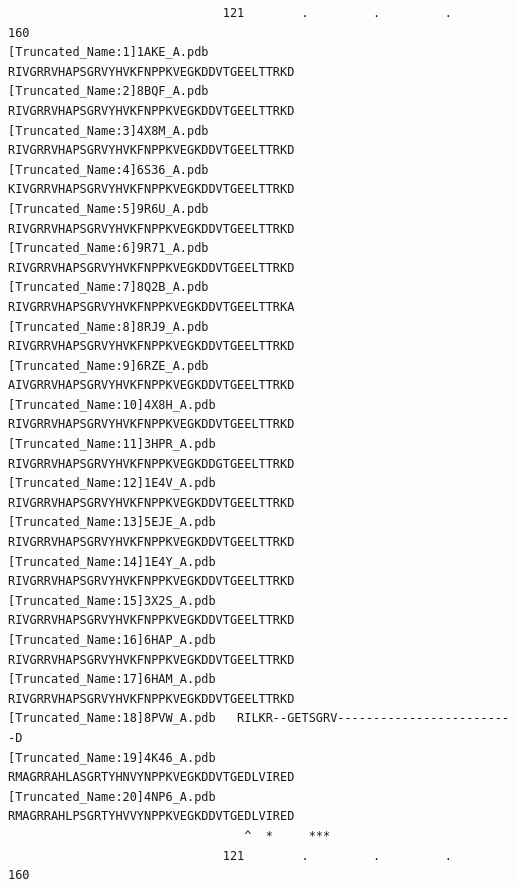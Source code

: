 \documentclass[
  letterpaper,
  DIV=11,
  numbers=noendperiod]{scrartcl}
\begin{document}
\begin{verbatim}
                              121        .         .         .         160 
[Truncated_Name:1]1AKE_A.pdb    RIVGRRVHAPSGRVYHVKFNPPKVEGKDDVTGEELTTRKD
[Truncated_Name:2]8BQF_A.pdb    RIVGRRVHAPSGRVYHVKFNPPKVEGKDDVTGEELTTRKD
[Truncated_Name:3]4X8M_A.pdb    RIVGRRVHAPSGRVYHVKFNPPKVEGKDDVTGEELTTRKD
[Truncated_Name:4]6S36_A.pdb    KIVGRRVHAPSGRVYHVKFNPPKVEGKDDVTGEELTTRKD
[Truncated_Name:5]9R6U_A.pdb    RIVGRRVHAPSGRVYHVKFNPPKVEGKDDVTGEELTTRKD
[Truncated_Name:6]9R71_A.pdb    RIVGRRVHAPSGRVYHVKFNPPKVEGKDDVTGEELTTRKD
[Truncated_Name:7]8Q2B_A.pdb    RIVGRRVHAPSGRVYHVKFNPPKVEGKDDVTGEELTTRKA
[Truncated_Name:8]8RJ9_A.pdb    RIVGRRVHAPSGRVYHVKFNPPKVEGKDDVTGEELTTRKD
[Truncated_Name:9]6RZE_A.pdb    AIVGRRVHAPSGRVYHVKFNPPKVEGKDDVTGEELTTRKD
[Truncated_Name:10]4X8H_A.pdb   RIVGRRVHAPSGRVYHVKFNPPKVEGKDDVTGEELTTRKD
[Truncated_Name:11]3HPR_A.pdb   RIVGRRVHAPSGRVYHVKFNPPKVEGKDDGTGEELTTRKD
[Truncated_Name:12]1E4V_A.pdb   RIVGRRVHAPSGRVYHVKFNPPKVEGKDDVTGEELTTRKD
[Truncated_Name:13]5EJE_A.pdb   RIVGRRVHAPSGRVYHVKFNPPKVEGKDDVTGEELTTRKD
[Truncated_Name:14]1E4Y_A.pdb   RIVGRRVHAPSGRVYHVKFNPPKVEGKDDVTGEELTTRKD
[Truncated_Name:15]3X2S_A.pdb   RIVGRRVHAPSGRVYHVKFNPPKVEGKDDVTGEELTTRKD
[Truncated_Name:16]6HAP_A.pdb   RIVGRRVHAPSGRVYHVKFNPPKVEGKDDVTGEELTTRKD
[Truncated_Name:17]6HAM_A.pdb   RIVGRRVHAPSGRVYHVKFNPPKVEGKDDVTGEELTTRKD
[Truncated_Name:18]8PVW_A.pdb   RILKR--GETSGRV-------------------------D
[Truncated_Name:19]4K46_A.pdb   RMAGRRAHLASGRTYHNVYNPPKVEGKDDVTGEDLVIRED
[Truncated_Name:20]4NP6_A.pdb   RMAGRRAHLPSGRTYHVVYNPPKVEGKDDVTGEDLVIRED
                                 ^  *     ***                            
                              121        .         .         .         160 


\end{verbatim}
\end{document}
